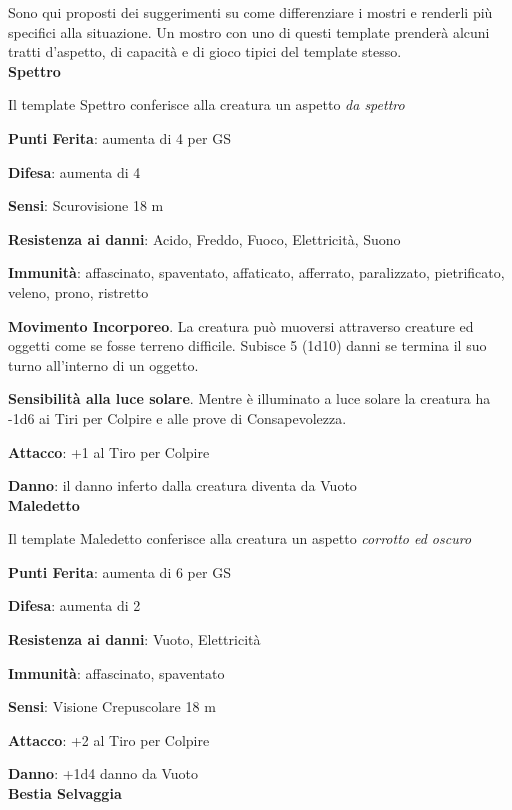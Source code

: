 \begin{multicols}{2}

Sono qui proposti dei suggerimenti su come differenziare i mostri e renderli più specifici alla situazione. Un mostro con uno di questi template prenderà alcuni tratti d'aspetto, di capacità e di gioco tipici del template stesso. \\

\textbf{Spettro}

Il template Spettro conferisce alla creatura un aspetto \emph{da spettro}

\textbf{Punti Ferita}: aumenta di 4 per GS

\textbf{Difesa}: aumenta di 4

\textbf{Sensi}: Scurovisione 18 m

\textbf{Resistenza ai danni}: Acido, Freddo, Fuoco, Elettricità, Suono

\textbf{Immunità}: affascinato, spaventato, affaticato, afferrato, paralizzato, pietrificato, veleno, prono, ristretto

\textbf{Movimento Incorporeo}. La creatura può muoversi attraverso creature ed oggetti come se fosse terreno difficile. Subisce 5 (1d10) danni se termina il suo turno
all’interno di un oggetto.

\textbf{Sensibilità alla luce solare}. Mentre è illuminato a luce solare la creatura ha -1d6 ai Tiri per Colpire e alle prove di Consapevolezza.

\textbf{Attacco}: +1 al Tiro per Colpire

\textbf{Danno}: il danno inferto dalla creatura diventa da Vuoto\\

\textbf{Maledetto}

Il template Maledetto conferisce alla creatura un aspetto \emph{corrotto ed oscuro}

\textbf{Punti Ferita}: aumenta di 6 per GS

\textbf{Difesa}: aumenta di 2

\textbf{Resistenza ai danni}: Vuoto, Elettricità

\textbf{Immunità}: affascinato, spaventato

\textbf{Sensi}: Visione Crepuscolare 18 m

\textbf{Attacco}: +2 al Tiro per Colpire

\textbf{Danno}: +1d4 danno da Vuoto\\

\textbf{Bestia Selvaggia}


\end{multicols}
